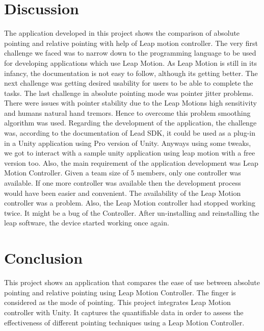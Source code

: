 \documentclass{article}
\begin{document}
\section{Discussion}
The application developed in this project shows the comparison of absolute pointing and relative pointing with help of Leap motion controller. The very first challenge we faced was to narrow down to the programming language to be used for developing applications which use Leap Motion. As Leap Motion is still in its infancy, the documentation is not easy to follow, although its getting better. The next challenge was getting desired usability for users to be able to complete the tasks.  The last challenge in absolute pointing mode was pointer jitter problems. There were issues with pointer stability due to the Leap Motions high sensitivity and humans natural hand tremors. Hence to overcome this problem smoothing algorithm was used. Regarding the development of the application, the challenge was, according to the documentation of Lead SDK, it could be used as a plug-in in a Unity application using Pro version of Unity. Anyways using some tweaks, we got to interact with a sample unity application using leap motion with a free version too. Also, the main requirement of the application development was Leap Motion Controller. Given a team size of 5 members, only one controller was available. If one more controller was available then the development process would have been easier and convenient. The availability of the Leap Motion controller was a problem. Also, the Leap Motion controller had stopped working twice. It might be a bug of the Controller. After un-installing and reinstalling the leap software, the device started working once again.



\section{Conclusion}
This project shows an application that compares the ease of use between absolute pointing and relative pointing using Leap Motion Controller. The finger is considered as the mode of pointing. This project integrates Leap Motion controller with Unity. It captures the quantifiable data in order to assess the effectiveness of different pointing techniques using a Leap Motion Controller. 




\end{document}
